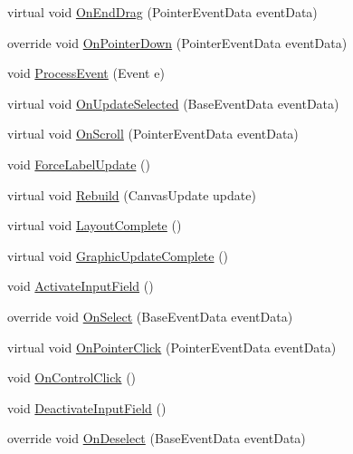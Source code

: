 \begin{DoxyCompactItemize}
virtual void \mbox{\hyperlink{class_t_m_pro_1_1_t_m_p___input_field_ae19fc88d3c5efaee7f436e700f16c54a}{On\+End\+Drag}} (Pointer\+Event\+Data event\+Data)
\item 
override void \mbox{\hyperlink{class_t_m_pro_1_1_t_m_p___input_field_a9b56bc090d1633c3452c7be950b9b373}{On\+Pointer\+Down}} (Pointer\+Event\+Data event\+Data)
\item 
void \mbox{\hyperlink{class_t_m_pro_1_1_t_m_p___input_field_abdbb932fc8d6aa12272b0a480ad13504}{Process\+Event}} (Event e)
\item 
virtual void \mbox{\hyperlink{class_t_m_pro_1_1_t_m_p___input_field_a6daaf6eadebb182f92aa088d7abb86dc}{On\+Update\+Selected}} (Base\+Event\+Data event\+Data)
\item 
virtual void \mbox{\hyperlink{class_t_m_pro_1_1_t_m_p___input_field_a459befbf2b33143cbcf80cf32f1953b8}{On\+Scroll}} (Pointer\+Event\+Data event\+Data)
\item 
void \mbox{\hyperlink{class_t_m_pro_1_1_t_m_p___input_field_aa9dfe88bdbfa9c6490c14833711d604f}{Force\+Label\+Update}} ()
\item 
virtual void \mbox{\hyperlink{class_t_m_pro_1_1_t_m_p___input_field_acb2dc09ce7a2a0ccda89e917a23d35f3}{Rebuild}} (Canvas\+Update update)
\item 
virtual void \mbox{\hyperlink{class_t_m_pro_1_1_t_m_p___input_field_a3828d087682e3659d369879a4bffac42}{Layout\+Complete}} ()
\item 
virtual void \mbox{\hyperlink{class_t_m_pro_1_1_t_m_p___input_field_a89a96f3d5ff67619b0c24c9cec50859d}{Graphic\+Update\+Complete}} ()
\item 
void \mbox{\hyperlink{class_t_m_pro_1_1_t_m_p___input_field_ac9c67e94d54028f82f604b75bdeac336}{Activate\+Input\+Field}} ()
\item 
override void \mbox{\hyperlink{class_t_m_pro_1_1_t_m_p___input_field_a7bfcd4822d6fa704e155a822fd357879}{On\+Select}} (Base\+Event\+Data event\+Data)
\item 
virtual void \mbox{\hyperlink{class_t_m_pro_1_1_t_m_p___input_field_a08cbf6021ac297247b38fbb6559b7996}{On\+Pointer\+Click}} (Pointer\+Event\+Data event\+Data)
\item 
void \mbox{\hyperlink{class_t_m_pro_1_1_t_m_p___input_field_a6b3e476c9e6b55214549999eedb4ff09}{On\+Control\+Click}} ()
\item 
void \mbox{\hyperlink{class_t_m_pro_1_1_t_m_p___input_field_a51726d0c870d54e1235c3b7d9c6a2425}{Deactivate\+Input\+Field}} ()
\item 
override void \mbox{\hyperlink{class_t_m_pro_1_1_t_m_p___input_field_a4408fce00917fd765ef1a1e5017a3464}{On\+Deselect}} (Base\+Event\+Data event\+Data)

\end{DoxyCompactItemize}
